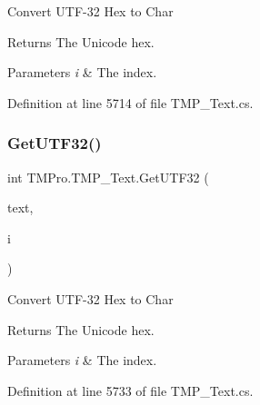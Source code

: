 Convert U\+T\+F-\/32 Hex to Char 

\begin{DoxyReturn}{Returns}
The Unicode hex.
\end{DoxyReturn}

\begin{DoxyParams}{Parameters}
{\em i} & The index.\\
\hline
\end{DoxyParams}


Definition at line 5714 of file T\+M\+P\+\_\+\+Text.\+cs.

\mbox{\label{class_t_m_pro_1_1_t_m_p___text_a6045beb3d2ffa3d3ff56b6b68d5a99fd}} 
\subsubsection{\texorpdfstring{GetUTF32()}{GetUTF32()}\hspace{0.1cm}{\footnotesize\ttfamily [2/2]}}
{\footnotesize\ttfamily int T\+M\+Pro.\+T\+M\+P\+\_\+\+Text.\+Get\+U\+T\+F32 (\begin{DoxyParamCaption}\item[{String\+Builder}]{text,  }\item[{int}]{i }\end{DoxyParamCaption})\hspace{0.3cm}{\ttfamily [protected]}}



Convert U\+T\+F-\/32 Hex to Char 

\begin{DoxyReturn}{Returns}
The Unicode hex.
\end{DoxyReturn}

\begin{DoxyParams}{Parameters}
{\em i} & The index.\\
\hline
\end{DoxyParams}


Definition at line 5733 of file T\+M\+P\+\_\+\+Text.\+cs.

\mbox{\label{class_t_m_pro_1_1_t_m_p___text_a455f31609db404fc228b7208b97a3a74}} 
